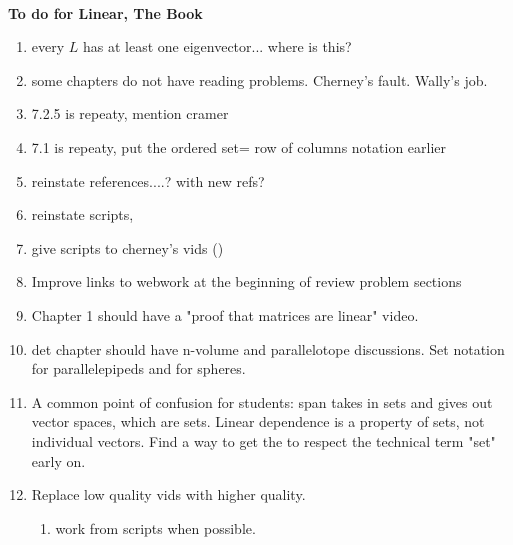 \documentclass[12pt]{article}
\begin{document}
\thispagestyle{empty}
~
\vspace{-3cm}

\begin{center}
\vspace{-1.5cm}
{\Large{\bfseries  
To do for Linear, The Book
}
 }  
\end{center}



\begin{enumerate}

\item every $L$ has at least one eigenvector... where is this?

\item some chapters do not have reading problems. Cherney's fault. Wally's job.

\item 7.2.5 is repeaty, mention cramer

\item 7.1 is repeaty, put the ordered set= row of columns notation earlier

\item reinstate references....? with new refs?

\item reinstate scripts, 

\item give scripts to cherney's vids ()

\item Improve links to webwork at the beginning of review problem sections

\item Chapter 1 should have a "proof that matrices are linear" video. 

\item det chapter should have n-volume and parallelotope discussions. Set notation for parallelepipeds and for spheres.

\item A common point of confusion for students: span takes in sets and gives out vector spaces, which are sets. Linear dependence is a property of sets, not individual vectors. Find a way to get the to respect the technical term "set" early on. 

\item Replace low quality vids with higher quality. 
\begin{enumerate}
\item work from scripts when possible.
\end{enumerate}


\end{enumerate}
\end{document}
